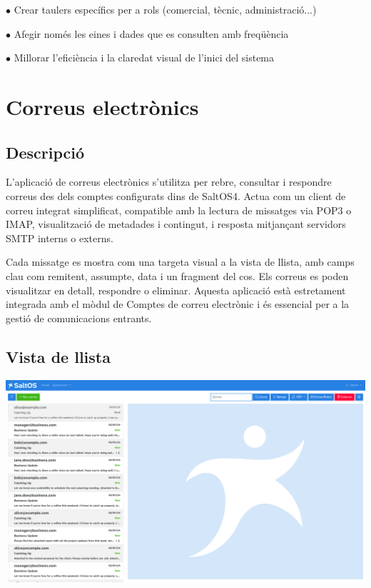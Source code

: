 \documentclass[a4paper]{article}
\begin{document}
\begin{compactitem}
\item[\color{myblue}$\bullet$] Crear taulers específics per a rols (comercial, tècnic, administració...)
\item[\color{myblue}$\bullet$] Afegir només les eines i dades que es consulten amb freqüència
\item[\color{myblue}$\bullet$] Millorar l’eficiència i la claredat visual de l’inici del sistema
\end{compactitem}


\hypertarget{toc90}{}
\section{Correus electrònics}

\hypertarget{toc91}{}
\subsection{Descripció}

L'aplicació de correus electrònics s'utilitza per rebre, consultar i respondre correus des dels comptes configurats dins de SaltOS4.
Actua com un client de correu integrat simplificat, compatible amb la lectura de missatges via POP3 o IMAP,
visualització de metadades i contingut, i resposta mitjançant servidors SMTP interns o externs.

Cada missatge es mostra com una targeta visual a la vista de llista, amb camps clau com remitent, assumpte,
data i un fragment del cos. Els correus es poden visualitzar en detall, respondre o eliminar. Aquesta aplicació
està estretament integrada amb el mòdul de Comptes de correu electrònic i és essencial per a la gestió de comunicacions entrants.

\hypertarget{toc92}{}
\subsection{Vista de llista}

\begin{center}\includegraphics[width=1\textwidth]{../ujest/snaps/test-screenshots-js-screenshots-emails-emails-list-ca-es-1-snap.png}\end{center}
\end{document}
